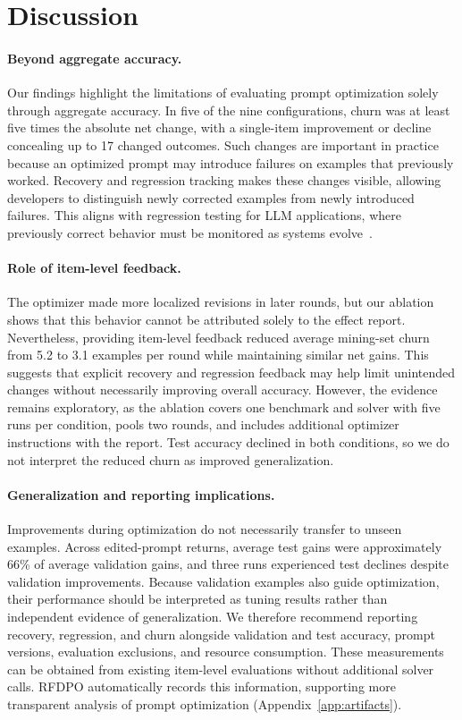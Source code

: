\documentclass[10pt]{article} %
\begin{document}
\section{Discussion}
\label{sec:discussion}

\paragraph{Beyond aggregate accuracy.}
Our findings highlight the limitations of evaluating prompt optimization solely through aggregate accuracy. In five of the nine configurations, churn was at least five times the absolute net change, with a single-item improvement or decline concealing up to 17 changed outcomes. Such changes are important in practice because an optimized prompt may introduce failures on examples that previously worked. Recovery and regression tracking makes these changes visible, allowing developers to distinguish newly corrected examples from newly introduced failures. This aligns with regression testing for LLM applications, where previously correct behavior must be monitored as systems evolve~\citep{ma2024regression}.

\paragraph{Role of item-level feedback.}
The optimizer made more localized revisions in later rounds, but our ablation shows that this behavior cannot be attributed solely to the effect report. Nevertheless, providing item-level feedback reduced average mining-set churn from 5.2 to 3.1 examples per round while maintaining similar net gains. This suggests that explicit recovery and regression feedback may help limit unintended changes without necessarily improving overall accuracy. However, the evidence remains exploratory, as the ablation covers one benchmark and solver with five runs per condition, pools two rounds, and includes additional optimizer instructions with the report. Test accuracy declined in both conditions, so we do not interpret the reduced churn as improved generalization.

\paragraph{Generalization and reporting implications.}
Improvements during optimization do not necessarily transfer to unseen examples. Across edited-prompt returns, average test gains were approximately 66\% of average validation gains, and three runs experienced test declines despite validation improvements. Because validation examples also guide optimization, their performance should be interpreted as tuning results rather than independent evidence of generalization. We therefore recommend reporting recovery, regression, and churn alongside validation and test accuracy, prompt versions, evaluation exclusions, and resource consumption. These measurements can be obtained from existing item-level evaluations without additional solver calls. RFDPO automatically records this information, supporting more transparent analysis of prompt optimization (Appendix~\ref{app:artifacts}).
\end{document}

